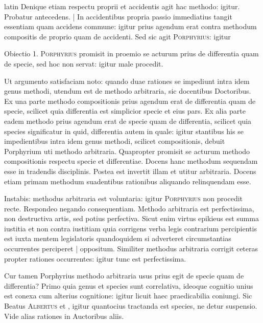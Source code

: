 \begin{otherlanguage*}{latin}
\pstart
Denique etiam respectu proprii et accidentis agit hac methodo:
igitur. Probatur antecedens. \textnormal{|} In accidentibus propria passio immediatius tangit essentiam quam accidens commune:
igitur prius agendum erat contra methodum compositis de proprio quam de accidenti. Sed sic agit \textsc{Porphyrius}:
igitur 
\pend

\pstart
Obiectio 1. \textsc{Porphyrius} promisit in proemio se acturum prius de differentia quam de specie, sed hoc non servat:
igitur male procedit. 
\pend

\pstart
Ut argumento satisfaciam noto:
quando duae rationes se impediunt intra idem genus methodi, utendum est de methodo arbitraria, sic docentibus Doctoribus. Ex una parte methodo compositionis prius agendum erat de differentia quam de specie, scilicet quia differentia est simplicior specie et eius pars. Ex alia parte eadem methodo prius agendum erat de specie quam de differentia, scilicet quia species significatur in quid, differentia autem in quale:
igitur stantibus his se impedientibus intra idem genus methodi, scilicet compositionis, debuit Porphyrium uti methodo arbitraria. Quapropter promisit se acturum methodo compositionis respectu specie et differentiae. Docens hanc methodum sequendam esse in tradendis disciplinis. Postea est invertit illam et utitur arbitraria. Docens etiam primam methodum suadentibus rationibus aliquando relinquendam esse. 
\pend

\pstart
Instabis:
methodus arbitraria est voluntaria:
igitur \textsc{Porphyrius} non procedit recte. Respondeo negando consequentiam. Methodo arbitraria est perfectissima, non destructiva artis, sed potius perfectiva. Sicut enim virtus epikieus est summa iustitia et non contra iustitiam quia corrigens verba legis contrarium percipientis est iuxta mentem legislatoris quandoquidem si adverteret circumstantias occurrentes perciperet \textnormal{|} oppositum. Similiter methodus arbitraria corrigit ceteras propter rationes occurrentes:
igitur tunc est perfectissima. 
\pend

\pstart
Cur tamen Porphyrius methodo arbitraria usus prius egit de specie quam de differentia? Primo quia genus et species sunt correlativa, ideoque cognitio unius est conexa cum alterius cognitione:
igitur licuit haec praedicabilia coniungi. Sic Beatus \textsc{Albertus} et , igitur quantocius tractanda est species, ne detur suspensio. Vide alias rationes in Auctoribus aliis. 
\pend


\end{otherlanguage*}
